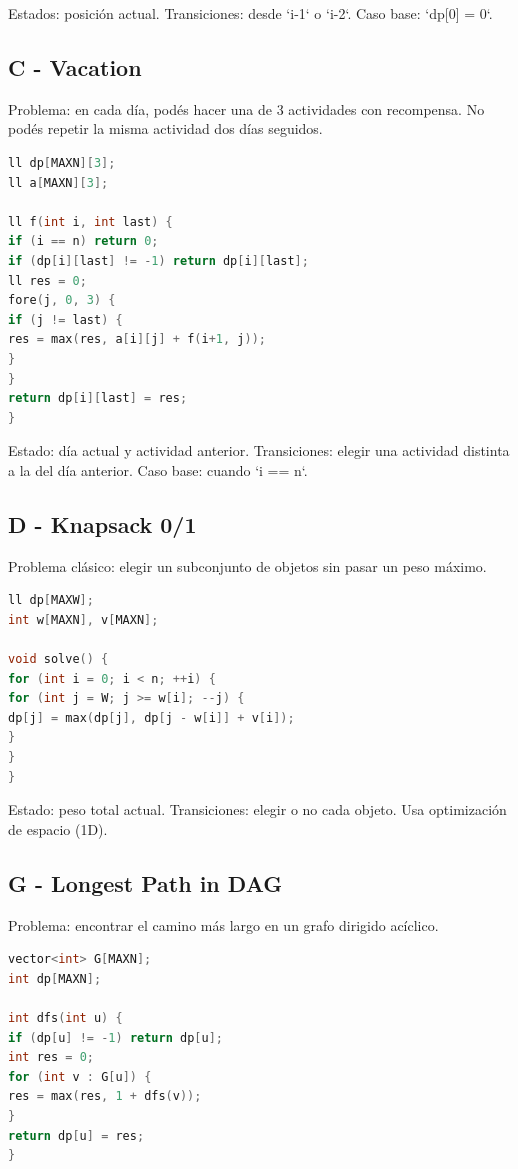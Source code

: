 Estados: posición actual.  
Transiciones: desde `i-1` o `i-2`.  
Caso base: `dp[0] = 0`.

\subsection{C - Vacation}

Problema: en cada día, podés hacer una de 3 actividades con recompensa. No podés repetir la misma actividad dos días seguidos.

\begin{lstlisting}[language=C++, caption=Vacation: DP sobre días y última actividad]
ll dp[MAXN][3];
ll a[MAXN][3];

ll f(int i, int last) {
if (i == n) return 0;
if (dp[i][last] != -1) return dp[i][last];
ll res = 0;
fore(j, 0, 3) {
if (j != last) {
res = max(res, a[i][j] + f(i+1, j));
}
}
return dp[i][last] = res;
}
\end{lstlisting}

Estado: día actual y actividad anterior.  
Transiciones: elegir una actividad distinta a la del día anterior.  
Caso base: cuando `i == n`.

\subsection{D - Knapsack 0/1}

Problema clásico: elegir un subconjunto de objetos sin pasar un peso máximo.

\begin{lstlisting}[language=C++, caption=Mochila 0/1: DP por peso]
ll dp[MAXW];
int w[MAXN], v[MAXN];

void solve() {
for (int i = 0; i < n; ++i) {
for (int j = W; j >= w[i]; --j) {
dp[j] = max(dp[j], dp[j - w[i]] + v[i]);
}
}
}
\end{lstlisting}

Estado: peso total actual.  
Transiciones: elegir o no cada objeto.  
Usa optimización de espacio (1D).

\subsection{G - Longest Path in DAG}

Problema: encontrar el camino más largo en un grafo dirigido acíclico.

\begin{lstlisting}[language=C++, caption=Camino más largo en DAG con DP + DFS]
vector<int> G[MAXN];
int dp[MAXN];

int dfs(int u) {
if (dp[u] != -1) return dp[u];
int res = 0;
for (int v : G[u]) {
res = max(res, 1 + dfs(v));
}
return dp[u] = res;
}
\end{lstlisting}

